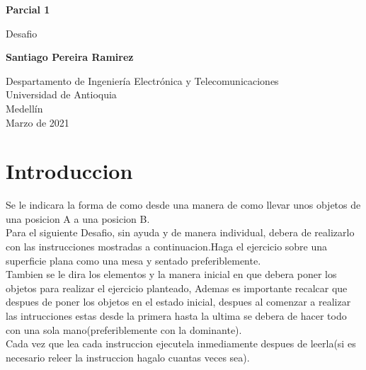 \documentclass{article}
\begin{document}
\begin{titlepage}
    \begin{center}
        \vspace*{1cm}
            
        \Huge
        \textbf{Parcial 1 }
            
        \vspace{0.5cm}
        \LARGE
        Desafio
            
        \vspace{1.5cm}
            
        \textbf{Santiago Pereira Ramirez}
            
        \vfill
            
        \vspace{0.8cm}
            
        \Large
        Despartamento de Ingeniería Electrónica y Telecomunicaciones\\
        Universidad de Antioquia\\
        Medellín\\
        Marzo de 2021
            
    \end{center}
\end{titlepage}

\tableofcontents
\newpage
\section{Introduccion }\label{intro}
Se le indicara la forma de como desde una manera de como llevar unos objetos de una posicion  A a una posicion B.\\


Para el siguiente Desafio, sin ayuda y de manera individual, debera de realizarlo con las instrucciones mostradas a continuacion.Haga el ejercicio sobre una superficie plana como una mesa y sentado preferiblemente.\\

Tambien se le dira los elementos y la manera inicial en que debera poner los objetos para realizar el ejercicio planteado, Ademas es importante recalcar que despues de poner los objetos en el estado inicial, despues al comenzar a realizar las intrucciones estas desde la primera hasta la ultima se debera de hacer todo con una sola mano(preferiblemente con la dominante).\\


Cada vez que lea cada instruccion ejecutela inmediamente despues de leerla(si es necesario releer la instruccion hagalo cuantas veces sea).\\
\end{document}
